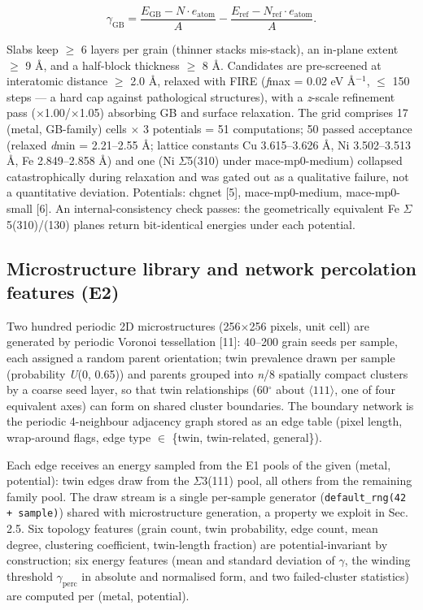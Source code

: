 \documentclass[11pt]{article}
\begin{document}
\[
\gamma_{\mathrm{GB}} = \frac{E_{\mathrm{GB}} - N\cdot e_{\mathrm{atom}}}{A} - \frac{E_{\mathrm{ref}} - N_{\mathrm{ref}}\cdot e_{\mathrm{atom}}}{A}.
\]

Slabs keep $\ge$ 6 layers per grain (thinner stacks mis-stack), an in-plane extent $\ge$ 9 \AA, and a half-block thickness $\ge$ 8 \AA. Candidates are pre-screened at interatomic distance $\ge$ 2.0 \AA, relaxed with FIRE (\textit{f}max = 0.02 eV \AA$^{-1}$, $\le$ 150 steps --- a hard cap against pathological structures), with a \textit{z}-scale refinement pass ($\times$1.00/$\times$1.05) absorbing GB and surface relaxation. The grid comprises 17 (metal, GB-family) cells $\times$ 3 potentials = 51 computations; 50 passed acceptance (relaxed \textit{d}min = 2.21--2.55 \AA; lattice constants Cu 3.615--3.626 \AA, Ni 3.502--3.513 \AA, Fe 2.849--2.858 \AA) and one (Ni $\Sigma$5(310) under mace-mp0-medium) collapsed catastrophically during relaxation and was gated out as a qualitative failure, not a quantitative deviation. Potentials: chgnet [5], mace-mp0-medium, mace-mp0-small [6]. An internal-consistency check passes: the geometrically equivalent Fe $\Sigma$5(310)/(130) planes return bit-identical energies under each potential.

\subsection{Microstructure library and network percolation features (E2)}

Two hundred periodic 2D microstructures (256$\times$256 pixels, unit cell) are generated by periodic Voronoi tessellation [11]: 40--200 grain seeds per sample, each assigned a random parent orientation; twin prevalence drawn per sample (probability \textit{U}(0, 0.65)) and parents grouped into \textit{n}/8 spatially compact clusters by a coarse seed layer, so that twin relationships (60$^\circ$ about $\langle 111\rangle$, one of four equivalent axes) can form on shared cluster boundaries. The boundary network is the periodic 4-neighbour adjacency graph stored as an edge table (pixel length, wrap-around flags, edge type $\in$ \{twin, twin-related, general\}).

Each edge receives an energy sampled from the E1 pools of the given (metal, potential): twin edges draw from the $\Sigma$3(111) pool, all others from the remaining family pool. The draw stream is a single per-sample generator (\texttt{default\_rng(42 + sample)}) shared with microstructure generation, a property we exploit in Sec. 2.5. Six topology features (grain count, twin probability, edge count, mean degree, clustering coefficient, twin-length fraction) are potential-invariant by construction; six energy features (mean and standard deviation of $\gamma$, the winding threshold $\gamma_{\mathrm{perc}}$ in absolute and normalised form, and two failed-cluster statistics) are computed per (metal, potential).
\end{document}
